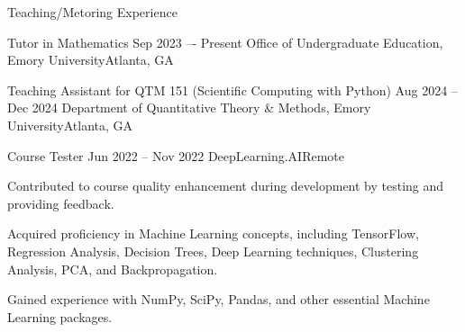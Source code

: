 \documentclass[10pt, letterpaper]{resume} %
\begin{document}
\begin{rSection}{Teaching/Metoring Experience} \itemsep -3pt

\begin{rSubsection}
	{Tutor in Mathematics}
	{Sep 2023 –- Present}
	{Office of Undergraduate Education, Emory University\hfill{Atlanta, GA}}
	\item 
\end{rSubsection}

\begin{rSubsection}
	{Teaching Assistant for QTM 151 (Scientific Computing with Python)}
	{Aug 2024 -- Dec 2024}
	{Department of Quantitative Theory \& Methods, Emory University\hfill{Atlanta, GA}}
	\item 
\end{rSubsection}

\begin{rSubsection}
	{Course Tester}
	{Jun 2022 -- Nov 2022}
	{DeepLearning.AI\hfill{Remote}}
	
	\item Contributed to course quality enhancement during development by testing and providing feedback. 
	\item Acquired proficiency in Machine Learning concepts, including TensorFlow, Regression Analysis, Decision Trees, Deep Learning techniques, Clustering Analysis, PCA, and Backpropagation.
	\item Gained experience with NumPy, SciPy, Pandas, and other essential Machine Learning packages.
\end{rSubsection}
\end{rSection}


\end{document}
